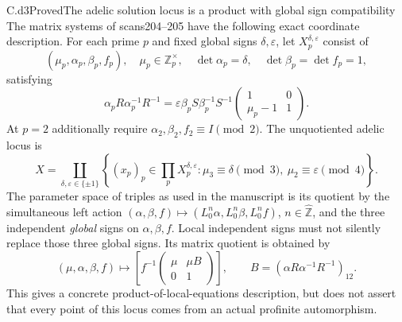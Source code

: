 \begin{claim}{C.d3}{Proved}{The adelic solution locus is a product with global sign compatibility}
The matrix systems of scans204--205 have the following exact coordinate description. For each prime $p$ and fixed global signs $\delta,\varepsilon$, let $X_p^{\delta,\varepsilon}$ consist of
\[
 (\mu_p,\alpha_p,\beta_p,f_p),\quad
 \mu_p\in\mathbb Z_p^\times,\quad
 \det\alpha_p=\delta,\quad\det\beta_p=\det f_p=1,
\]
satisfying
\[
 \alpha_pR\alpha_p^{-1}R^{-1}
 =\varepsilon\beta_pS\beta_p^{-1}S^{-1}
 \begin{pmatrix}1&0\\\mu_p-1&1\end{pmatrix}.
\]
At $p=2$ additionally require $\alpha_2,\beta_2,f_2\equiv I\pmod2$. The unquotiented adelic locus is
\[
 X=\coprod_{\delta,\varepsilon\in\{\pm1\}}
 \left\{(x_p)_p\in\prod_pX_p^{\delta,\varepsilon}:
 \mu_3\equiv\delta\pmod3,\ \mu_2\equiv\varepsilon\pmod4\right\}.
\]
The parameter space of triples as used in the manuscript is its quotient by the simultaneous left action
$(\alpha,\beta,f)\mapsto(L_0^n\alpha,L_0^n\beta,L_0^nf)$, $n\in\widehat{\mathbb Z}$, and the three independent \emph{global} signs on $\alpha,\beta,f$. Local independent signs must not silently replace those three global signs. Its matrix quotient is obtained by
\[
 (\mu,\alpha,\beta,f)\longmapsto
 \left[f^{-1}\begin{pmatrix}\mu&\mu B\\0&1\end{pmatrix}\right],
 \qquad B=(\alpha R\alpha^{-1}R^{-1})_{12}.
\]
This gives a concrete product-of-local-equations description, but does not assert that every point of this locus comes from an actual profinite automorphism.
\end{claim}
